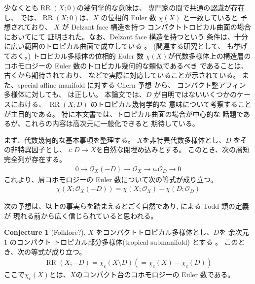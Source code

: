 \documentclass[a4paper,dvipdfmx,reqno,12pt]{amsart}
\theoremstyle{definition}
\newtheorem{conjecture}[theorem]{Conjecture}
\newcommand{\opn}[1]{\operatorname{#1}}
\numberwithin{equation}{section}
\begin{document}
少なくとも$\opn{RR}(X;0)$の幾何学的な意味は、
専門家の間で共通の認識が存在し、
\cite[Conjecture 6.13]{demedrano2023chern}
では、$\opn{RR}(X;0)$は、$X$
の位相的 Euler 数 $\chi(X)$ と一致していると
予想されており、
$X$ が Delzant face 構造を持つ
コンパクトトロピカル曲面の場合
において\cite[Theorem 6.3]{demedrano2023chern}にて
証明された。なお、Delzant face 構造を持つという
条件は、十分に広い範囲のトロピカル曲面で成立している
\cite[Corollary 6.11]{demedrano2023chern}。
(関連する研究として、\cite{cartwright2015combinatorial}
も挙げておく。)
トロピカル多様体の位相的 Euler 数
$\chi(X)$が代数多様体上の構造層の
コホモロジーの Euler 数のトロピカル幾何的な類似であるべき
であることは、古くから期待されており、
\cite[Corollary 2]{MR3961331}
などで実際に対応していることが示されている。
また、special affine manifold に対する
Chern 予想 \cite{MR3665000} から、
コンパクト整アフィン多様体に対しても、
\cite[Conjecture 6.13]{demedrano2023chern}
は正しい。
本論文では、$D$ が自明ではないいくつかのケースにおける、
$\opn{RR}(X;D)$ のトロピカル幾何学的な
意味について考察することが主目的である。
特に本文書では、トロピカル曲面の場合が中心的な
話題であるが、これらの内容は高次元に一般化できると
期待している。

まず、代数幾何的な基本事項を整理する。
$X$を非特異代数多様体とし、$D$ をその非特異因子とし、
$\iota\colon D\to X$を自然な閉埋め込みとする。
このとき、次の層短完全列が存在する。
\begin{align}
     0\to \mathcal{O}_X(-D)\to 
\mathcal{O}_X\to \iota_*\mathcal{O}_D\to 0
\end{align}
これより、層コホモロジーの Euler 数について次の等式が成り立つ。
\begin{align}
\label{equation-anti-effective-divisor}
\chi(X;\mathcal{O}_X(-D))=\chi(X;\mathcal{O}_X)
-\chi(D;\mathcal{O}_D)
\end{align}

次の予想は、以上の事実らを踏まえるとごく自然であり,
\cite{demedrano2023chern} による Todd 類の定義が
現れる前から広く信じられていると思われる。

\begin{conjecture}[{Folklore?}]
\label{conjecture-rr-c-euler}
$X$ をコンパクトトロピカル多様体とし、$D$を
余次元 $1$
のコンパクト
トロピカル部分多様体(tropical submanifold)
とする \cite[Definition 2.14]{demedrano2023chern}。
このとき、次の等式が成り立つ。
\begin{align}
\opn{RR}(X;-D)=
\chi_c (X\setminus D) (=\chi_c (X)-\chi_c(D))
\end{align}
ここで$\chi_c(X)$とは、$X$のコンパクト台のコホモロジーの
Euler 数である。
\end{conjecture}
\end{document}
